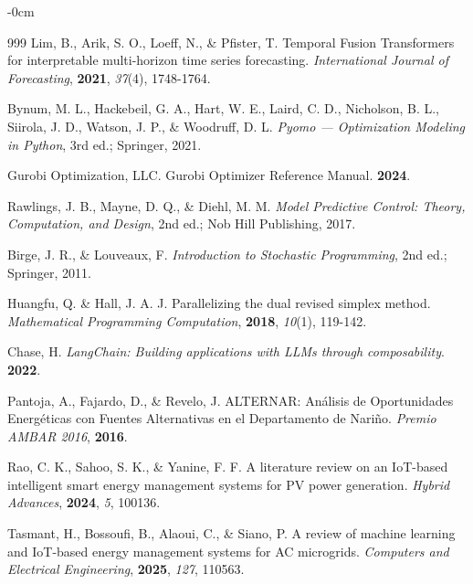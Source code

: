 \documentclass[journal,article,submit,pdftex,moreauthors]{Definitions/mdpi}
\begin{document}
\begin{adjustwidth}{-\extralength}{0cm}
\begin{thebibliography}{999}
Lim, B., Arik, S. O., Loeff, N., \& Pfister, T. Temporal Fusion Transformers for interpretable multi-horizon time series forecasting. \textit{International Journal of Forecasting}, \textbf{2021}, \textit{37}(4), 1748-1764.

Bynum, M. L., Hackebeil, G. A., Hart, W. E., Laird, C. D., Nicholson, B. L., Siirola, J. D., Watson, J. P., \& Woodruff, D. L. \textit{Pyomo --- Optimization Modeling in Python}, 3rd ed.; Springer, 2021.

Gurobi Optimization, LLC. Gurobi Optimizer Reference Manual. \textbf{2024}.

Rawlings, J. B., Mayne, D. Q., \& Diehl, M. M. \textit{Model Predictive Control: Theory, Computation, and Design}, 2nd ed.; Nob Hill Publishing, 2017.

Birge, J. R., \& Louveaux, F. \textit{Introduction to Stochastic Programming}, 2nd ed.; Springer, 2011.

Huangfu, Q. \& Hall, J. A. J. Parallelizing the dual revised simplex method. \textit{Mathematical Programming Computation}, \textbf{2018}, \textit{10}(1), 119-142.

Chase, H. \textit{LangChain: Building applications with LLMs through composability}. \textbf{2022}.

Pantoja, A., Fajardo, D., \& Revelo, J. ALTERNAR: An\'alisis de Oportunidades Energ\'eticas con Fuentes Alternativas en el Departamento de Nari\~no. \textit{Premio AMBAR 2016}, \textbf{2016}.

Rao, C. K., Sahoo, S. K., \& Yanine, F. F. A literature review on an IoT-based intelligent smart energy management systems for PV power generation. \textit{Hybrid Advances}, \textbf{2024}, \textit{5}, 100136.

Tasmant, H., Bossoufi, B., Alaoui, C., \& Siano, P. A review of machine learning and IoT-based energy management systems for AC microgrids. \textit{Computers and Electrical Engineering}, \textbf{2025}, \textit{127}, 110563.


\end{thebibliography}
\end{adjustwidth}
\end{document}
